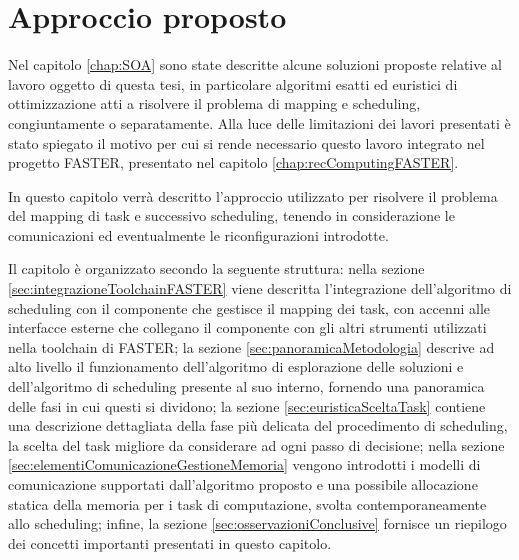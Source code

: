 \chapter{Approccio proposto}
\label{chap:approccio}
\vspace{1cm}
Nel capitolo \ref{chap:SOA} sono state descritte alcune soluzioni proposte 
relative al lavoro oggetto di questa tesi, in particolare algoritmi esatti ed
euristici di ottimizzazione atti a risolvere il problema di mapping e 
scheduling, congiuntamente o separatamente. Alla luce delle limitazioni dei 
lavori presentati è stato spiegato il motivo per cui si rende necessario questo 
lavoro integrato nel progetto \ac{FASTER}, presentato nel capitolo
\ref{chap:recComputingFASTER}.


In questo capitolo verrà descritto l'approccio utilizzato per risolvere il 
problema del mapping di task e successivo scheduling, tenendo in considerazione le comunicazioni ed
eventualmente le riconfigurazioni introdotte.

Il capitolo è organizzato secondo la seguente struttura: nella sezione 
\ref{sec:integrazioneToolchainFASTER} viene descritta l'integrazione 
dell'algoritmo di scheduling con il componente che gestisce il mapping dei task, 
con accenni alle interfacce esterne che collegano il componente 
con gli altri strumenti utilizzati nella toolchain di \acs{FASTER}; la sezione 
\ref{sec:panoramicaMetodologia} descrive ad alto livello il funzionamento 
dell'algoritmo di esplorazione delle soluzioni e dell'algoritmo di scheduling
presente al suo interno, fornendo una panoramica delle fasi in cui questi si dividono;
la sezione \ref{sec:euristicaSceltaTask} contiene una descrizione 
dettagliata della fase più delicata del procedimento di scheduling, la scelta 
del task migliore da considerare ad ogni passo di decisione; nella sezione 
\ref{sec:elementiComunicazioneGestioneMemoria} vengono introdotti i modelli di 
comunicazione supportati dall'algoritmo proposto e una possibile allocazione 
statica della memoria per i task di computazione, svolta contemporaneamente allo 
scheduling; infine, la sezione \ref{sec:osservazioniConclusive} fornisce un 
riepilogo dei concetti importanti presentati in questo capitolo.


